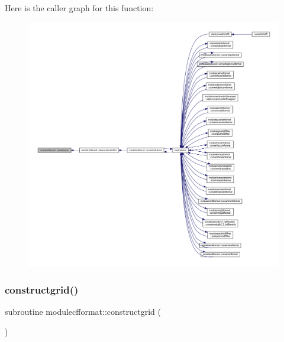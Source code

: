 Here is the caller graph for this function\+:\nopagebreak
\begin{figure}[H]
\begin{center}
\leavevmode
\includegraphics[width=350pt]{namespacemodulecfformat_a63d0a39020a58e43589f5140948d8d58_icgraph}
\end{center}
\end{figure}
\mbox{\label{namespacemodulecfformat_a9105e21bd9d021767ea028d72b9a201a}} 
\subsubsection{\texorpdfstring{constructgrid()}{constructgrid()}}
{\footnotesize\ttfamily subroutine modulecfformat\+::constructgrid (\begin{DoxyParamCaption}{ }\end{DoxyParamCaption})\hspace{0.3cm}{\ttfamily [private]}}

